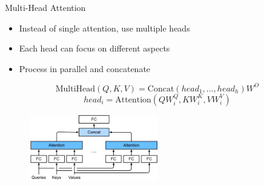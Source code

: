 \documentclass[serif, aspectratio=169]{beamer}
\begin{document}
\begin{frame}{Multi-Head Attention}
    \begin{itemize}
        \item Instead of single attention, use multiple heads
        \item Each head can focus on different aspects
        \item Process in parallel and concatenate
    \end{itemize}
    \begin{equation*}
        \text{MultiHead}(Q,K,V) = \text{Concat}(head_1,\ldots,head_h)W^O
    \end{equation*}
    \begin{equation*}
        head_i = \text{Attention}(QW^Q_i,KW^K_i,VW^V_i)
    \end{equation*}
    
    \begin{figure}
    	\centering
    	\includegraphics[width=0.5\textwidth]{pic/multi-head-attention__AIE.png}
    	\label{fig:multihead_attention-3}
    \end{figure}
    \vfill
    
\end{frame}
\end{document}
